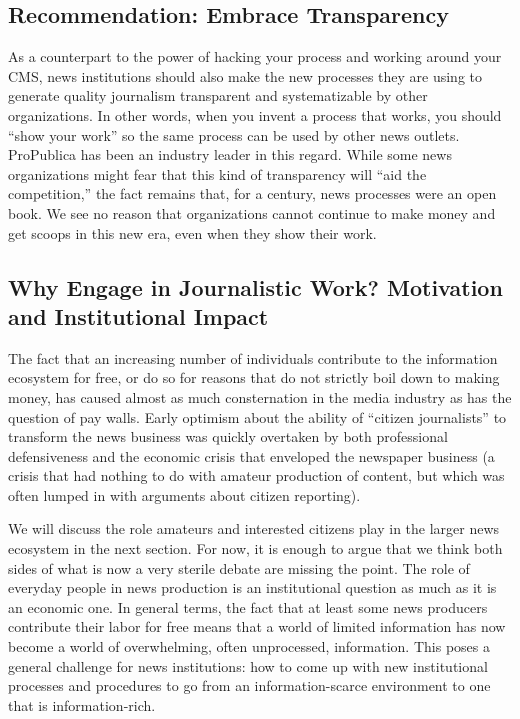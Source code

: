 \subsection{Recommendation: Embrace Transparency}
As a counterpart to the power of hacking your process and working
around your CMS, news institutions should also make the new processes
they are using to generate quality journalism transparent and
systematizable by other organizations. In other words, when you invent
a process that works, you should ``show your work'' so the same process
can be used by other news outlets. ProPublica has been an industry
leader in this regard. While some news organizations might fear that this
kind of transparency will ``aid the competition,'' the fact remains that,
for a century, news processes were an open book. We see no reason that
organizations cannot continue to make money and get scoops in this
new era, even when they show their work.

\subsection{Why Engage in Journalistic Work? Motivation and Institutional Impact}

The fact that an increasing number of individuals contribute to the information
ecosystem for free, or do so for reasons that do not strictly boil down to making
money, has caused almost as much consternation in the media industry as has the
question of pay walls. Early optimism about the ability of ``citizen journalists'' to
transform the news business was quickly overtaken by both professional defensiveness
and the economic crisis that enveloped the newspaper business (a crisis
that had nothing to do with amateur production of content, but which was often
lumped in with arguments about citizen reporting).

We will discuss the role amateurs and interested citizens play in the larger news
ecosystem in the next section. For now, it is enough to argue that we think
both sides of what is now a very sterile debate are missing the point. The role of
everyday people in news production is an institutional question as much as it is
an economic one. In general terms, the fact that at least some news producers
contribute their labor for free means that a world of limited information has now
become a world of overwhelming, often unprocessed, information. This poses a
general challenge for news institutions: how to come up with new institutional
processes and procedures to go from an information-scarce environment to one
that is information-rich.

